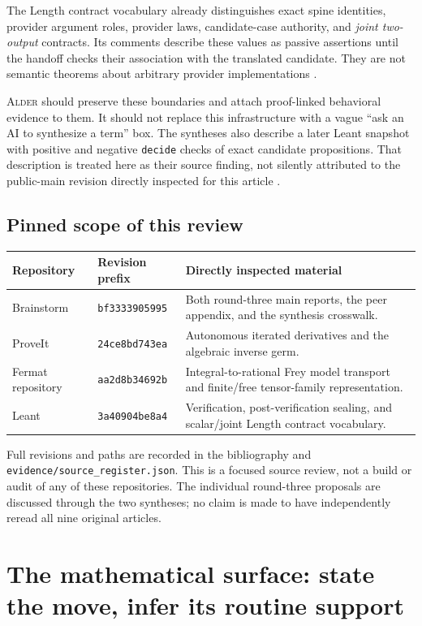 \documentclass[11pt,a4paper]{article}
\newcommand{\code}[1]{\nolinkurl{#1}}
\newcommand{\Alder}{\textsc{Alder}}
\theoremstyle{plain}
\theoremstyle{definition}
\theoremstyle{remark}
\begin{document}
The Length contract vocabulary already distinguishes exact spine identities, provider argument roles, provider laws, candidate-case authority, and \emph{joint two-output} contracts. Its comments describe these values as passive assertions until the handoff checks their association with the translated candidate. They are not semantic theorems about arbitrary provider implementations \cite{lengthcontracts}.

\Alder{} should preserve these boundaries and attach proof-linked behavioral evidence to them. It should not replace this infrastructure with a vague ``ask an AI to synthesize a term'' box. The syntheses also describe a later Leant snapshot with positive and negative \code{decide} checks of exact candidate propositions. That description is treated here as their source finding, not silently attributed to the public-main revision directly inspected for this article \cite{r3a,r3b}.

\subsection{Pinned scope of this review}
\begin{center}\small
\begin{tabularx}{\textwidth}{@{}P{.18\textwidth}P{.20\textwidth}Y@{}}
\toprule Repository & Revision prefix & Directly inspected material\\\midrule
Brainstorm & \code{bf3333905995} & Both round-three main reports, the peer appendix, and the synthesis crosswalk.\\
ProveIt & \code{24ce8bd743ea} & Autonomous iterated derivatives and the algebraic inverse germ.\\
Fermat repository & \code{aa2d8b34692b} & Integral-to-rational Frey model transport and finite/free tensor-family representation.\\
Leant & \code{3a40904be8a4} & Verification, post-verification sealing, and scalar/joint Length contract vocabulary.\\
\bottomrule
\end{tabularx}
\end{center}
Full revisions and paths are recorded in the bibliography and \code{evidence/source_register.json}. This is a focused source review, not a build or audit of any of these repositories. The individual round-three proposals are discussed through the two syntheses; no claim is made to have independently reread all nine original articles.

\section{The mathematical surface: state the move, infer its routine support}\label{sec:surface}
\end{document}
